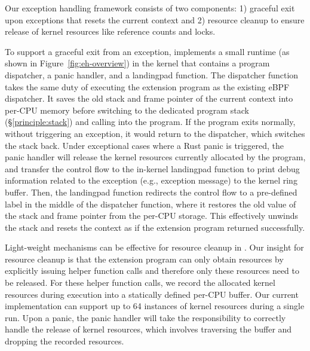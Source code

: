 Our exception handling framework consists of two components: 1) graceful exit
    upon exceptions that resets the current context and 2) resource cleanup to
    ensure release of kernel resources like reference counts and locks.

To support a graceful exit from an exception, \projname{} implements a small
    runtime (as shown in Figure~\ref{fig:eh-overview}) in the kernel that
    contains a program dispatcher, a panic handler, and a landingpad function.
The dispatcher function takes the same duty of executing the extension program
    as the existing eBPF dispatcher.
It saves the old stack and frame pointer of the current context into per-CPU
    memory before switching to the dedicated program stack
    (\S\ref{principle:stack}) and calling into the program.
If the program exits normally, without triggering an exception, it would
    return to the dispatcher, which switches the stack back.
Under exceptional cases where a Rust panic is triggered, the panic handler will
    release the kernel resources currently allocated by the program, and
    transfer the control flow to the in-kernel landingpad function to print
    debug information related to the exception (e.g., exception message) to the
    kernel ring buffer.
Then, the landingpad function redirects the control flow to a pre-defined label
    in the middle of the dispatcher function, where it restores the old value
    of the stack and frame pointer from the per-CPU storage.
This effectively unwinds the stack and resets the context as if the extension
    program returned successfully.

Light-weight mechanisms can be effective for resource cleanup in \projname{}.
Our insight for resource cleanup is that the extension program can only obtain
    resources by explicitly issuing helper function calls and therefore only
    these resources need to be released.
For these helper function calls, we record the allocated kernel resources
    during execution into a statically defined per-CPU buffer.
Our current implementation can support up to 64
    instances of kernel resources during a single run.
Upon a panic, the panic handler will take the responsibility to correctly
    handle the release of kernel resources, which involves traversing the
    buffer and dropping the recorded resources.

